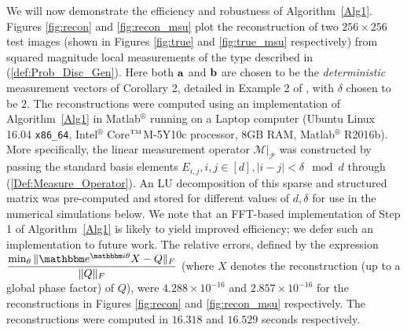 We will now demonstrate the efficiency and robustness of Algorithm~\ref{Alg1}. Figures
\ref{fig:recon} and \ref{fig:recon_msu} plot the reconstruction of two $256\times 256$ test 
images (shown in Figures \ref{fig:true} and \ref{fig:true_msu} respectively) from squared
magnitude local measurements of the type described in (\ref{def:Prob_Disc_Gen}). Here both $\mathbf a$ and $\mathbf b$ are
chosen to be the {\em deterministic} measurement vectors of Corollary 2, detailed in Example 2 of \cite[Section
2]{iwen2016phase}, with $\delta$ chosen to be $2$. The reconstructions were computed using an
implementation of Algorithm~\ref{Alg1} in Matlab$^\circledR$ running on a Laptop computer (Ubuntu
Linux 16.04 {\tt x86\_64}, Intel$^\circledR$ Core$^{\text{\tiny TM}}$M-5Y10c processor, 8GB RAM,
Matlab$^\circledR$ R2016b). More specifically, the linear measurement operator $\left. \mathcal M
\right \vert_{\mathcal P}$ was constructed by passing the standard basis elements $E_{i,j}, i,j \in
[d], |i-j|< \delta \mod d$ through (\ref{Def:Measure_Operator}). An LU decomposition of this sparse
and structured matrix was pre-computed and stored for different values of $d,\delta$ for use in the
numerical simulations below. We note that an FFT-based implementation of Step 1 of
Algorithm~\ref{Alg1} is likely to yield improved efficiency; we defer such an implementation to
future work. The relative errors, defined by the expression $\displaystyle \frac{\min_\theta\Vert
\mathbbm e^{\mathbbm i \theta} X-Q\Vert_F}{\Vert Q\Vert_F}$ (where $X$ denotes the
reconstruction (up to a global phase factor) of $Q$), were $4.288\times 10^{-16}$ and $2.857\times 10^{-16}$ for the
reconstructions in Figures \ref{fig:recon} and \ref{fig:recon_msu} respectively. The reconstructions
were computed in $16.318$ and $16.529$ seconds respectively. 

